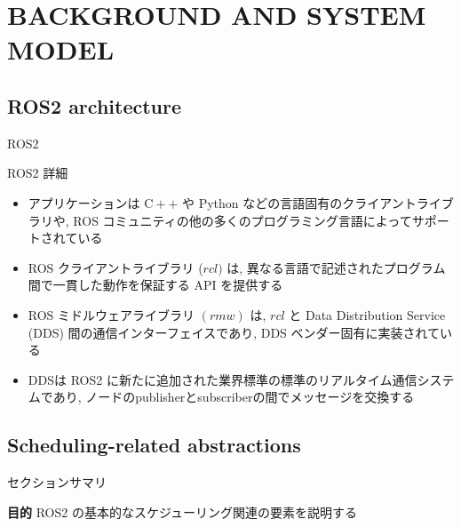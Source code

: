 
\section{BACKGROUND AND SYSTEM MODEL}
\label{sec: background_and_system_model}


\subsection{ROS2 architecture}
\label{ssec: ros2 architecture}

\begin{frame}{ROS2}
\end{frame}

\begin{frame}{ROS2 詳細}
    \begin{itemize}
        \item アプリケーションは $\mathrm{C}++$ や Python などの言語固有のクライアントライブラリや, ROS コミュニティの他の多くのプログラミング言語によってサポートされている
        \item ROS クライアントライブラリ ($r c l)$ は, 異なる言語で記述されたプログラム間で一貫した動作を保証する API を提供する
        \item ROS ミドルウェアライブラリ $(r m w)$ は, $r c l$ と Data Distribution Service (DDS) 間の通信インターフェイスであり, DDS ベンダー固有に実装されている
        \item DDSは ROS2 に新たに追加された業界標準の標準のリアルタイム通信システムであり, ノードのpublisherとsubscriberの間でメッセージを交換する
    \end{itemize}
\end{frame}


\subsection{Scheduling-related abstractions}
\label{ssec: scheduling-related abstractions}

\begin{frame}{セクションサマリ}
    \begin{itembox}[l]{\textbf{目的}}
        ROS2 の基本的なスケジューリング関連の要素を説明する
    \end{itembox}
\end{frame}

